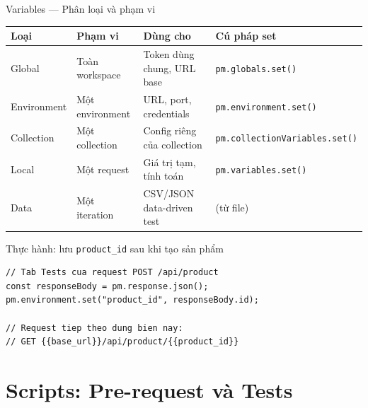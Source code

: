 \documentclass[aspectratio=169,10pt]{beamer}
\begin{document}
\begin{frame}[fragile]{Variables --- Phân loại và phạm vi}
  \begin{center}
  \small
  \begin{tabular}{llp{3.5cm}l}
    \toprule
    \textbf{Loại} & \textbf{Phạm vi} & \textbf{Dùng cho} & \textbf{Cú pháp set} \\
    \midrule
    Global      & Toàn workspace  & Token dùng chung, URL base & \texttt{pm.globals.set()} \\
    Environment & Một environment & URL, port, credentials   & \texttt{pm.environment.set()} \\
    Collection  & Một collection  & Config riêng của collection & \texttt{pm.collectionVariables.set()} \\
    Local       & Một request     & Giá trị tạm, tính toán    & \texttt{pm.variables.set()} \\
    Data        & Một iteration   & CSV/JSON data-driven test  & (từ file) \\
    \bottomrule
  \end{tabular}
  \end{center}

  \vspace{0.3em}
  \begin{block}{Thực hành: lưu \texttt{product\_id} sau khi tạo sản phẩm}
\begin{lstlisting}[style=nonumber]
// Tab Tests cua request POST /api/product
const responseBody = pm.response.json();
pm.environment.set("product_id", responseBody.id);

// Request tiep theo dung bien nay:
// GET {{base_url}}/api/product/{{product_id}}
\end{lstlisting}
  \end{block}
\end{frame}

\section{Scripts: Pre-request và Tests}
\end{document}
